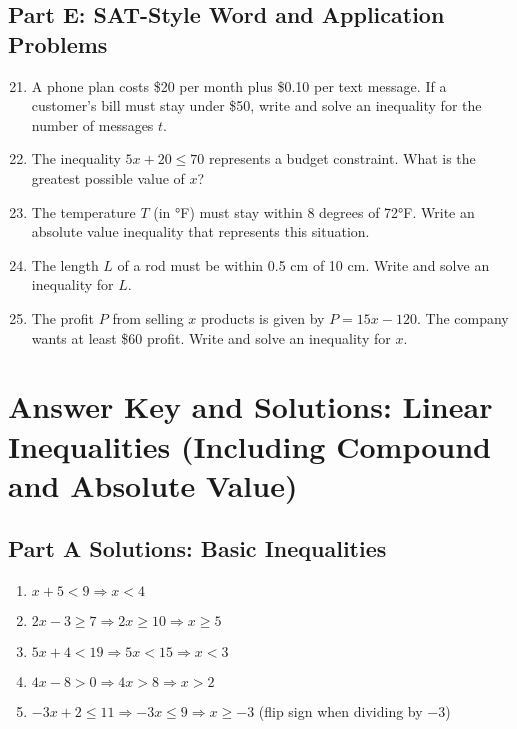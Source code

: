 \documentclass[14pt]{extarticle}
\begin{document}
\subsection*{Part E: SAT-Style Word and Application Problems}
\begin{enumerate}
    \setcounter{enumi}{20}
    \item A phone plan costs \$20 per month plus \$0.10 per text message.  
    If a customer’s bill must stay under \$50, write and solve an inequality for the number of messages \(t\).
    \item The inequality \(5x + 20 \le 70\) represents a budget constraint. What is the greatest possible value of \(x\)?
    \item The temperature \(T\) (in °F) must stay within 8 degrees of 72°F. Write an absolute value inequality that represents this situation.
    \item The length \(L\) of a rod must be within 0.5 cm of 10 cm. Write and solve an inequality for \(L\).
    \item The profit \(P\) from selling \(x\) products is given by \(P = 15x - 120\).  
    The company wants at least \$60 profit. Write and solve an inequality for \(x\).
\end{enumerate}

\newpage


\section*{Answer Key and Solutions: Linear Inequalities (Including Compound and Absolute Value)}

\subsection*{Part A Solutions: Basic Inequalities}
\begin{enumerate}
    \item \(x + 5 < 9 \Rightarrow x < \boxed{4}\)
    \item \(2x - 3 \ge 7 \Rightarrow 2x \ge 10 \Rightarrow x \ge \boxed{5}\)
    \item \(5x + 4 < 19 \Rightarrow 5x < 15 \Rightarrow x < \boxed{3}\)
    \item \(4x - 8 > 0 \Rightarrow 4x > 8 \Rightarrow x > \boxed{2}\)
    \item \(-3x + 2 \le 11 \Rightarrow -3x \le 9 \Rightarrow x \ge \boxed{-3}\) \quad (flip sign when dividing by \(-3\))
\end{enumerate}
\end{document}

